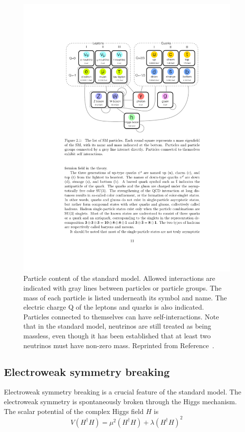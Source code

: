 \begin{figure}[htbp]
    \centering
    \includegraphics[width=\textwidth]{Figures/Theory/SM_Interactions.pdf}
    \caption[Particle content of the standard model.]{Particle content of the standard model. Allowed interactions are indicated with gray lines between particles or particle groups. The mass of each particle is listed underneath its symbol and name. The electric charge Q of the leptons and quarks is also indicated. Particles connected to themselves can have self-interactions. Note that in the standard model, neutrinos are still treated as being massless, even though it has been established that at least two neutrinos must have non-zero mass.
    Reprinted from Reference~\cite{Yutaro}.}
    \label{fig:SMint}
\end{figure}


\subsection{Electroweak symmetry breaking}
\label{sec:EWSB}
Electroweak symmetry breaking is a crucial feature of the standard model. The electroweak symmetry is spontaneously broken through the Higgs mechanism. 
The scalar potential of the complex Higgs field $H$ is
\begin{equation}
V(H^\dagger H) =  \mu^2(H^\dagger H) + \lambda(H^\dagger H)^2
\label{equ:HiggsV}
\end{equation}


